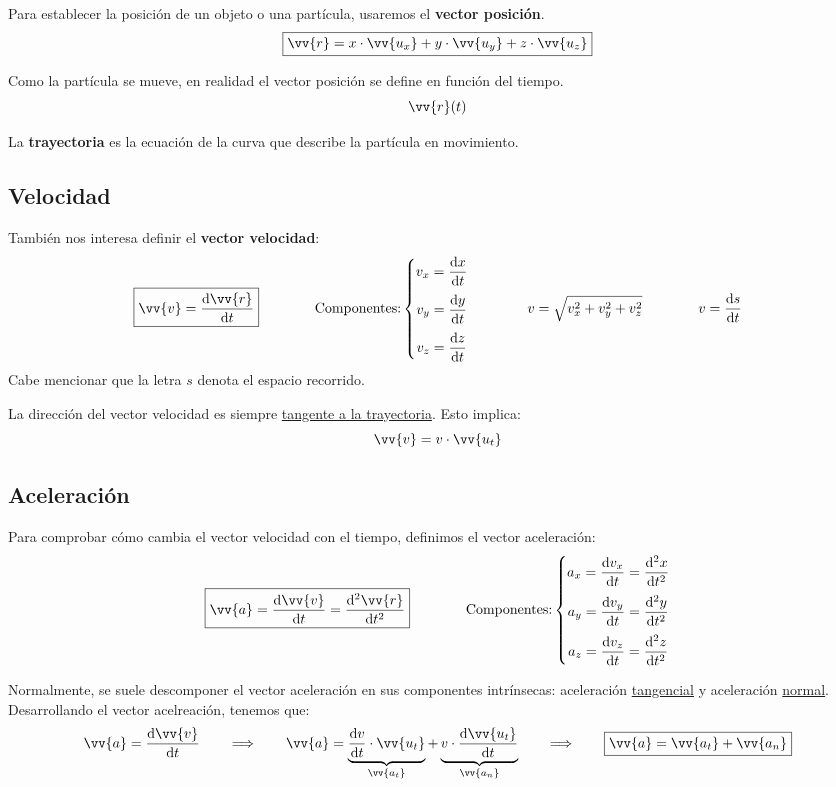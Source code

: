 \documentclass[a4paper]{book}
\numberwithin{figure}{chapter}
\numberwithin{equation}{chapter}
\renewcommand{\vec}[1]{\vv{{#1}}}
\begin{document}
Para establecer la posición de un objeto o una partícula, usaremos el \textbf{vector posición}. \[\boxed{\vec{r} = x\cdot \vec{u_x} + y\cdot \vec{u_y} + z\cdot \vec{u_z}}\]

Como la partícula se mueve, en realidad el vector posición se define en función del tiempo. \[\vec{r} (t)\]

La \textbf{trayectoria} es la ecuación de la curva que describe la partícula en movimiento.

\subsection{Velocidad}
También nos interesa definir el \textbf{vector velocidad}:
\[\boxed{\vec{v} = \dv{\vec{r}}{t}} \qquad \qquad \text{Componentes:} \left\{ \begin{matrix}
		\displaystyle{v_x = \dv{x}{t}} \\[10pt]
		\displaystyle{v_y = \dv{y}{t}} \\[10pt]
		\displaystyle{v_z = \dv{z}{t}}\end{matrix} \right. \qquad \qquad v = \sqrt{v_x^2+v_y^2+v_z^2}\qquad \qquad v=\dv{s}{t} \]
Cabe mencionar que la letra $s$ denota el espacio recorrido.

La dirección del vector velocidad es siempre \underline{tangente a la trayectoria}. Esto implica: \[\vec{v}=v\cdot \vec{u_t}\]

\subsection{Aceleración}
Para comprobar cómo cambia el vector velocidad con el tiempo, definimos el vector aceleración: \[\boxed{\vec{a} = \dv{\vec{v}}{t}=\dv{^2 \vec{r}}{t^2}} \qquad \qquad \text{Componentes:}\left\{ \begin{matrix}
		\displaystyle{a_x = \dv{v_x}{t} = \dv{^2x}{t^2}} \\[10pt]
		\displaystyle{a_y = \dv{v_y}{t} = \dv{^2y}{t^2}} \\[10pt]
		\displaystyle{a_z = \dv{v_z}{t} = \dv{^2z}{t^2}}\end{matrix} \right. \]

Normalmente, se suele descomponer el vector aceleración en sus componentes intrínsecas: aceleración \underline{tangencial} y aceleración \underline{normal}. Desarrollando el vector acelreación, tenemos que: \[ \vec{a} = \dv{\vec{v}}{t} \qquad \Longrightarrow \qquad
	\vec{a} = \underbrace{\dv{v}{t}\cdot \vec{u_t}}_{\vec{a_t}} + \underbrace{v\cdot \dv{\vec{u_t}}{t}}_{\vec{a_n}}\qquad \Longrightarrow \qquad \boxed{\vec{a} = \vec{a_t} + \vec{a_n}}\]
\end{document}
